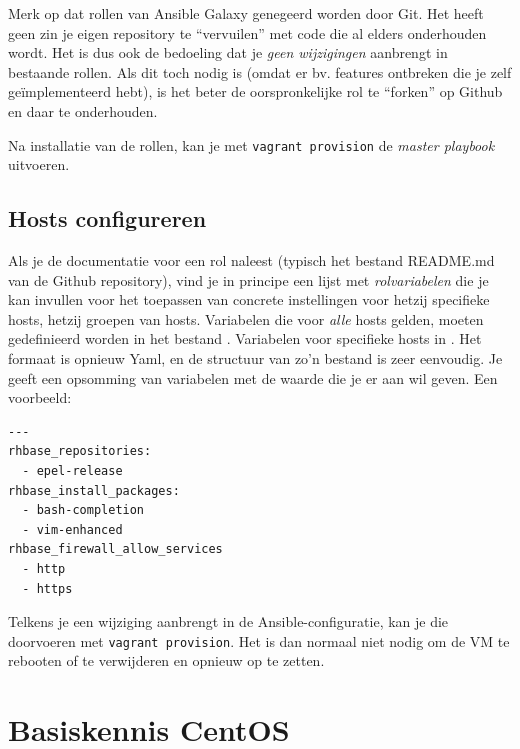 Merk op dat rollen van Ansible Galaxy genegeerd worden door Git. Het heeft geen zin je eigen repository te ``vervuilen'' met code die al elders onderhouden wordt. Het is dus ook de bedoeling dat je \emph{geen wijzigingen} aanbrengt in bestaande rollen. Als dit toch nodig is (omdat er bv. features ontbreken die je zelf geïmplementeerd hebt), is het beter de oorspronkelijke rol te ``forken'' op Github en daar te onderhouden.

Na installatie van de rollen, kan je met \texttt{vagrant\ provision} de \emph{master playbook} uitvoeren.

\subsection{Hosts configureren}
\label{sub:hosts-configureren}

Als je de documentatie voor een rol naleest (typisch het bestand README.md van de Github repository), vind je in principe een lijst met \emph{rolvariabelen} die je kan invullen voor het toepassen van concrete instellingen voor hetzij specifieke hosts, hetzij groepen van hosts. Variabelen die voor \emph{alle} hosts gelden, moeten gedefinieerd worden in het bestand . Variabelen voor specifieke hosts in . Het formaat is opnieuw Yaml, en de structuur van zo'n bestand is zeer eenvoudig. Je geeft een opsomming van variabelen met de waarde die je er aan wil geven. Een voorbeeld:

\begin{verbatim}
---
rhbase_repositories:
  - epel-release
rhbase_install_packages:
  - bash-completion
  - vim-enhanced
rhbase_firewall_allow_services
  - http
  - https
\end{verbatim}

Telkens je een wijziging aanbrengt in de Ansible-configuratie, kan je die doorvoeren met \texttt{vagrant\ provision}. Het is dan normaal niet nodig om de VM te rebooten of te verwijderen en opnieuw op te zetten.

\section{Basiskennis CentOS}
\label{sec:basiskennis_centos}

